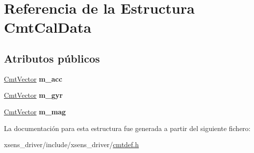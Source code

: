 \hypertarget{structCmtCalData}{\section{\-Referencia de la \-Estructura \-Cmt\-Cal\-Data}
\label{structCmtCalData}
}
\subsection*{\-Atributos públicos}
\begin{DoxyCompactItemize}
\item 
\hypertarget{structCmtCalData_aeb5760447947b5e677f425ea4df4325a}{\hyperlink{structCmtVector}{\-Cmt\-Vector} {\bfseries m\-\_\-acc}}\label{structCmtCalData_aeb5760447947b5e677f425ea4df4325a}

\item 
\hypertarget{structCmtCalData_a1c00de0be6dedd5f1d6ccee706e069aa}{\hyperlink{structCmtVector}{\-Cmt\-Vector} {\bfseries m\-\_\-gyr}}\label{structCmtCalData_a1c00de0be6dedd5f1d6ccee706e069aa}

\item 
\hypertarget{structCmtCalData_a2c1c50f55c5af0f361f7d50ea73c1a46}{\hyperlink{structCmtVector}{\-Cmt\-Vector} {\bfseries m\-\_\-mag}}\label{structCmtCalData_a2c1c50f55c5af0f361f7d50ea73c1a46}

\end{DoxyCompactItemize}


\-La documentación para esta estructura fue generada a partir del siguiente fichero\-:\begin{DoxyCompactItemize}
\item 
xsens\-\_\-driver/include/xsens\-\_\-driver/\hyperlink{cmtdef_8h}{cmtdef.\-h}\end{DoxyCompactItemize}
